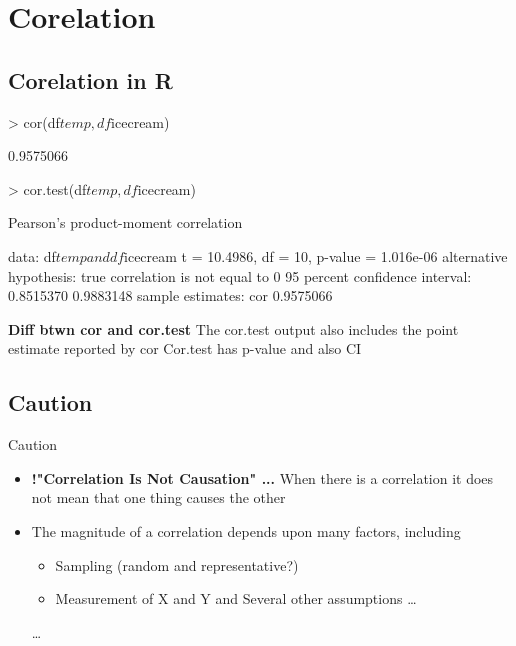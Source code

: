\documentclass[slidestop,compress,14pt,xcolor=dvipsnames]{beamer}
\begin{document}
\section{Corelation}
\subsection{Corelation in R}
\clearpage
\begin{Schunk}
\begin{Sinput}
> cor(df$temp,df$icecream)
\end{Sinput}
\begin{Soutput}
[1] 0.9575066
\end{Soutput}
\begin{Sinput}
> cor.test(df$temp,df$icecream)
\end{Sinput}
\begin{Soutput}
	Pearson's product-moment correlation

data:  df$temp and df$icecream
t = 10.4986, df = 10, p-value = 1.016e-06
alternative hypothesis: true correlation is not equal to 0
95 percent confidence interval:
 0.8515370 0.9883148
sample estimates:
      cor 
0.9575066 
\end{Soutput}
\end{Schunk}
{\bf Diff btwn cor and cor.test}
The cor.test output also includes the point estimate reported by cor
Cor.test has p-value and also CI

\clearpage

\fontsize{12pt}{14pt}\selectfont

\subsection{Caution}
\begin{frame}{Caution}
\begin{itemize}
\item {\bf !"Correlation Is Not Causation" ... }\newline
When there is a correlation it does not mean that one thing causes the other
\item The magnitude of a correlation depends upon
many factors, including 
\begin{itemize}
\item Sampling (random and representative?)
\item Measurement of X and Y and Several other assumptions 
\ldots
\end{itemize}
\ldots
\end{itemize}
\end{frame}
\end{document}
